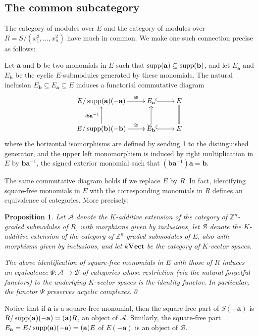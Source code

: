 \documentclass{tran-l}
\newtheorem{proposition}[theorem]{Proposition}
\theoremstyle{definition}
\theoremstyle{remark}
\newcommand{\Z}{{\mathbb{Z}}}
\newcommand{\Acal}{{{\mathcal A}}}
\newcommand{\baa}{{\mathbf{a}}}
\newcommand{\bb}{{\mathbf{b}}}
\newcommand{\kVect}{{{k{\mathbf{Vect}}}}}
\newcommand{\supp}{\mathop{\rm supp}\nolimits}
\newcommand{\B}{{\mathcal B}}
\begin{document}
\subsection*{The common subcategory}
The category of modules
over $E$ and the category of modules over $R=S/(x_1^2,\dots,x_n^2)$ 
have much in common.
We make one such connection precise as follows:

Let $\baa$ and $\bb$ be two monomials in $E$ such that
$\supp(\baa)\subseteq\supp(\bb)$, and let $E_\baa$ and $E_\bb$
be the cyclic $E$-submodules generated by these monomials.
The natural inclusion $E_\bb\subseteq E_\baa\subseteq E$ induces
a functorial commutative diagram
\[
\begin{xy}
\xymatrix{
E/\supp(\baa)(-\baa)\ar[r]^(.7)\cong & E_\baa \ar@{^{(}->}[r]& E\ar@{=}[d]\\ 
E/\supp(\bb)(-\bb)\ar[u]^{\cdot \bb\baa^{-1}}\ar[r]^(.7)\cong& 
E_\bb\ar@{^{(}->}[u]\ar@{^{(}->}[r] &E  
}
\end{xy}
\]
where the horizontal isomorphisms are defined by sending 1
to the distinguished generator, and the upper left
monomorphism is induced by right multiplication in $E$
by $\bb\baa^{-1}$, 
\pagebreak
the signed exterior monomial such that
$(\bb\baa^{-1})\baa=\bb$.

The same commutative diagram holds if we replace
$E$ by $R$. In fact,
identifying square-free monomials in $E$ with the corresponding
monomials in $R$ defines an equivalence of categories. More precisely:

\begin{proposition}\label{equivER} Let $\Acal$ denote the $K$-additive extension of the
category of $\Z^n$-graded submodules of $R$, with morphisms given
by inclusions, let $\B$ denote the $K$-additive extension of the
category of $\Z^n$-graded submodules of $E$, also with morphisms given
by inclusions, and let $\kVect$ be the category of $K$-vector spaces.

The above identification of square-free monomials in $E$ with those of $R$ 
induces an equivalence $\Psi:\Acal \to \B$ of categories 
whose restriction (via the natural forgetful functors) 
to the underlying $K$-vector spaces is the
identity functor. 
In particular, the functor $\Psi$ preserves acyclic complexes.\qed
\end{proposition}

Notice that if $\baa$ is a square-free monomial, then the square-free part of 
$S(-\baa)$ is $R/\supp(\baa)(-\baa)=(\baa)R$, an object of $\Acal$.
Similarly, the square-free part $E_\baa=E/\supp(\baa)(-\baa)=(\baa)E$
of $E(-\baa)$ is an object of $\B$.
\end{document}
